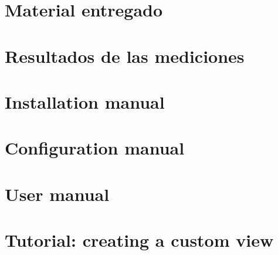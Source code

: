 \section{Material entregado}
\label{anexo:material_entregado}


\section{Resultados de las mediciones}
\label{anexo:resultados_mediciones}


\section{Installation manual}
\label{anexo_manual_instalacion}


\section{Configuration manual}
\label{anexo_manual_configuracion}


\section{User manual}
\label{anexo_manual_usuario}


\section{Tutorial: creating a custom view}
\label{anexo_vista_personalizada}



